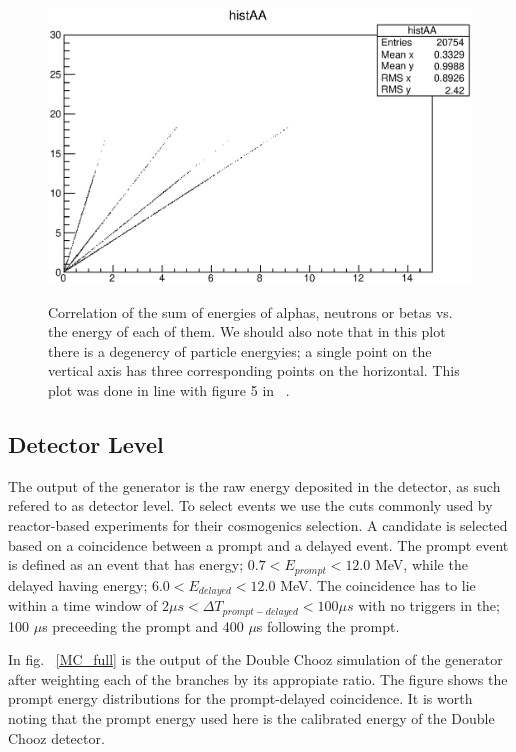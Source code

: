 \documentclass{JINST}
\begin{document}
       \begin{figure}[htp]
    \begin{center}
  \includegraphics[scale=0.65]{histAA.eps}
   \label{histAA}
    \end{center}
    \caption{ Correlation of the sum of energies of alphas, neutrons or betas vs. the energy of each of them. We should also note that 
    in this plot there is a degenercy of particle energyies; a single point on the vertical axis has three corresponding points on the
    horizontal. This plot was done in line with figure 5 in ~\cite{Prezado200543}.}
 \end{figure}

   


\subsection{Detector Level}

       The output of the generator is the raw energy deposited in the detector, as such refered to as detector level. To select \liNINE events we use the 
       cuts commonly used by reactor-based experiments for their cosmogenics selection. A \liNINE candidate is selected based on a 
       coincidence between a prompt and a delayed event. The prompt event is defined as an event that has energy; $ 0.7 < E_{prompt} < 12.0$ MeV, while the 
       delayed having energy; $ 6.0 < E_{delayed} < 12.0$ MeV. The coincidence has to lie within a time window of $2 \mu s < \Delta T_{prompt-delayed} < 100 \mu s $
       with no triggers in the; 
       100 $\mu$s preceeding the prompt and 400 $\mu$s following the prompt.
       
       
       In fig. ~\ref{MC_full} is the output of the Double Chooz simulation of the generator after weighting each of the branches by its appropiate 
       ratio. The figure shows the prompt energy distributions for the prompt-delayed coincidence. It is worth noting that the 
       prompt energy used here is the calibrated energy of the Double Chooz detector.
       
\end{document}
